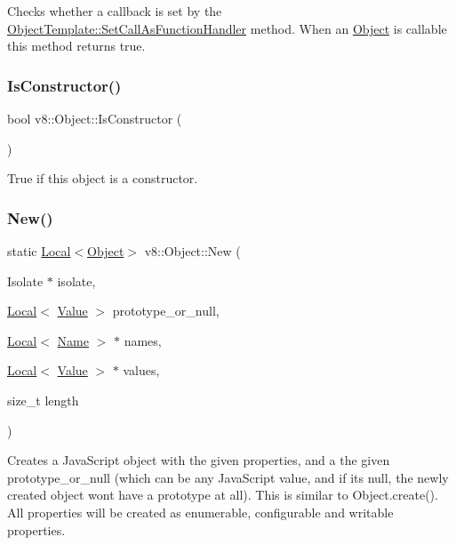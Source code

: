 Checks whether a callback is set by the \mbox{\hyperlink{classv8_1_1ObjectTemplate_a1775c8f73e643c339804d2f5b628eddf}{Object\+Template\+::\+Set\+Call\+As\+Function\+Handler}} method. When an \mbox{\hyperlink{classv8_1_1Object}{Object}} is callable this method returns true. \mbox{\label{classv8_1_1Object_a257233cb6b11dc7bb5a0e8df8695e889}} 
\subsubsection{\texorpdfstring{Is\+Constructor()}{IsConstructor()}}
{\footnotesize\ttfamily bool v8\+::\+Object\+::\+Is\+Constructor (\begin{DoxyParamCaption}{ }\end{DoxyParamCaption})}

True if this object is a constructor. \mbox{\label{classv8_1_1Object_a91733478a00a8d80d109531d2f741569}} 
\subsubsection{\texorpdfstring{New()}{New()}}
{\footnotesize\ttfamily static \mbox{\hyperlink{classv8_1_1Local}{Local}}$<$\mbox{\hyperlink{classv8_1_1Object}{Object}}$>$ v8\+::\+Object\+::\+New (\begin{DoxyParamCaption}\item[{Isolate $\ast$}]{isolate,  }\item[{\mbox{\hyperlink{classv8_1_1Local}{Local}}$<$ \mbox{\hyperlink{classv8_1_1Value}{Value}} $>$}]{prototype\+\_\+or\+\_\+null,  }\item[{\mbox{\hyperlink{classv8_1_1Local}{Local}}$<$ \mbox{\hyperlink{classv8_1_1Name}{Name}} $>$ $\ast$}]{names,  }\item[{\mbox{\hyperlink{classv8_1_1Local}{Local}}$<$ \mbox{\hyperlink{classv8_1_1Value}{Value}} $>$ $\ast$}]{values,  }\item[{size\+\_\+t}]{length }\end{DoxyParamCaption})\hspace{0.3cm}{\ttfamily [static]}}

Creates a Java\+Script object with the given properties, and a the given prototype\+\_\+or\+\_\+null (which can be any Java\+Script value, and if it\textquotesingle{}s null, the newly created object won\textquotesingle{}t have a prototype at all). This is similar to Object.\+create(). All properties will be created as enumerable, configurable and writable properties. \mbox{\label{classv8_1_1Object_a7a65552d78eff4a1b9755f99167f4255}} 
